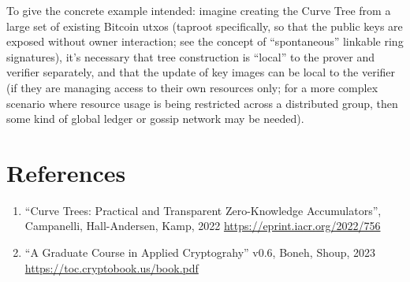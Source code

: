 \documentclass[10pt,a4paper]{article}
\providecommand{\tightlist}{%
  \setlength{\itemsep}{0pt}\setlength{\parskip}{0pt}}
\begin{document}
To give the concrete example intended: imagine creating the Curve Tree from a large set of existing Bitcoin utxos (taproot specifically, so that the public keys are exposed without owner interaction; see the concept of ``spontaneous'' linkable ring signatures), it's necessary that tree construction is ``local'' to the prover and verifier separately, and that the update of key images can be local to the verifier (if they are managing access to their own resources only; for a more complex scenario where resource usage is being restricted across a distributed group, then some kind of global ledger or gossip network may be needed).

\section{References}
\begin{enumerate}
\def\labelenumi{\arabic{enumi}.}
\tightlist
\item
  \protect\hypertarget{anchor-1}{}{}``Curve Trees: Practical and Transparent Zero-Knowledge Accumulators'', Campanelli, Hall-Andersen, Kamp, 2022
  \url{https://eprint.iacr.org/2022/756}
 \item
  \protect\hypertarget{anchor-2}{}{}``A Graduate Course in Applied Cryptograhy'' v0.6, Boneh, Shoup, 2023
  \url{https://toc.cryptobook.us/book.pdf}
  \end{enumerate}
\end{document}

